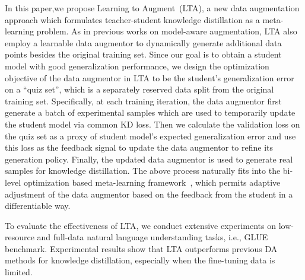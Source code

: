 In this paper,we propose Learning to Augment~(LTA), a new data augmentation approach which formulates teacher-student knowledge distillation as a meta-learning problem. 
As in previous works on model-aware augmentation, LTA also employ a learnable data augmentor to dynamically generate additional data points besides the original training set. Since our goal is to obtain a student model with good generalization performance, we design the optimization objective of the data augmentor in LTA to be the student's generalization error on a ``quiz set'', which is a separately reserved data split from the original training set. 
Specifically, at each training iteration, the data augmentor first generate a batch of experimental samples which are used to temporarily update the student model via common KD loss. Then we calculate the validation loss on the quiz set as a proxy of student model's expected generalization error and use this loss as the feedback signal to update the data augmentor to refine its generation policy. Finally, the updated data augmentor is used to generate real samples for knowledge distillation. The above process naturally fits into the bi-level optimization based meta-learning framework~\cite{maml}, which permits adaptive adjustment of the data augmentor based on the feedback from the student in a 
differentiable way.

To evaluate the effectiveness of LTA, we conduct extensive experiments on low-resource and full-data natural language understanding tasks, i.e., GLUE~\cite{glue} benchmark. Experimental results show that LTA outperforms previous DA methods for knowledge distillation, especially when the fine-tuning data is limited.

